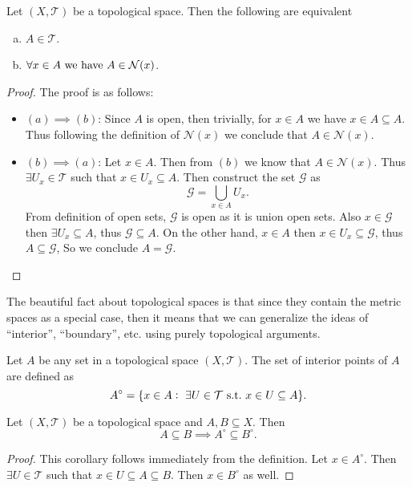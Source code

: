 \begin{lembox}{}
	Let $(X, \mathcal{T})$ be a topological space. Then the following are equivalent
	\begin{enumerate}[(a)]
		\item $A \in \mathcal{T}$.
		\item $\forall x\in A \ \text{we have}\  A \in \mathcal{N}(x)$.
	\end{enumerate}
\end{lembox}
\begin{proof} The proof is as follows: 
	\begin{itemize}
		\item $(a) \implies (b)$: Since $A$ is open, then trivially, for $x\in A$ we have $x\in A \subseteq A$. Thus following the definition of $\mathcal{N}(x)$ we conclude that $A \in  \mathcal{N}(x)$.
		\item $(b) \implies (a)$: Let $x \in A$. Then from $(b)$ we know that $A \in  \mathcal{N}(x)$. Thus $\exists U_x \in \mathcal{T}$ such that $x\in U_x \subseteq A$. Then construct the set $\mathcal{G}$ as 
		\[ \mathcal{G} = \bigcup_{x\in A} U_x. \]
		From definition of open sets, $\mathcal{G}$ is open as it is union open sets. Also $x \in \mathcal{G}$ then $\exists U_x \subseteq A$, thus $\mathcal{G} \subseteq A$. On the other hand, $x\in A$ then $x\in U_x \subseteq \mathcal{G}$, thus $A \subseteq \mathcal{G}$, So we conclude $A = \mathcal{G}$.
	\end{itemize}
\end{proof}

The beautiful fact about topological spaces is that since they contain the metric spaces as a special case, then it means that we can generalize the ideas of ``interior'', ``boundary'', etc. using purely topological arguments.

\begin{defbox}
	Let $A$ be any set in a topological space $(X,\mathcal{T})$. The set of interior points of $A$ are defined as
	\[ A^{\circ} = \{ x\in A:\ \exists U\in \mathcal{T} \st x\in U \subseteq A \}. \]
\end{defbox}

\begin{corbox}
	Let $(X,\mathcal{T})$ be a topological space and $A,B \subseteq X$. Then 
	\[ A \subseteq B \implies A^\circ \subseteq B^\circ. \]
\end{corbox}
\begin{proof}
	This corollary follows immediately from the definition. Let $x\in A^\circ$. Then $\exists U \in \mathcal{T}$ such that $x\in U \subseteq A \subseteq B$. Then $x \in B^\circ$ as well.   
\end{proof}

